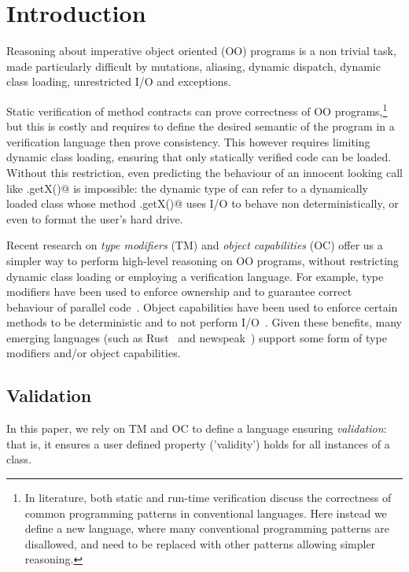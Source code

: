 
\section{Introduction}
\saveSpace\saveSpace

Reasoning about imperative object oriented (OO) programs is a non trivial task,
made particularly difficult by mutations, aliasing, dynamic dispatch, dynamic class loading,
unrestricted I/O and exceptions.

Static verification of method contracts can prove correctness of OO programs,\footnote{
In literature, both static and run-time verification discuss
the correctness of common programming patterns in conventional languages. Here instead we define a new language, where
many conventional programming patterns are disallowed,
and need to be replaced with other patterns allowing simpler reasoning.
} but this is costly and requires to define the desired semantic of the program in a verification language then prove consistency.
This however requires limiting dynamic class loading, ensuring that only statically verified code can be loaded.
Without this restriction, even predicting the behaviour of an innocent looking call like 
\Q@myPoint.getX()@ is impossible: the dynamic type of \Q@myPoint@ can refer to a dynamically loaded class
whose method \Q@.getX()@ uses I/O to behave non deterministically, or even to format the user’s hard drive.

Recent research on \emph{type modifiers} (TM) and \emph{object capabilities} (OC) offer us a simpler way to perform high-level reasoning on OO programs, without restricting dynamic class loading or employing a verification language.
For example, type modifiers have been used to enforce ownership and to guarantee correct behaviour of parallel code~\cite{GordonEtAl12,clebsch2015deny,clebsch2017orca}. Object capabilities have been used to enforce certain methods to be deterministic and to not perform I/O~\cite{finifter2008verifiable}.
Given these benefits, many emerging languages (such as Rust~\cite{matsakis2014rust} and newspeak~\cite{bracha2010modules})
support some form of type modifiers and/or object capabilities.

\loseSpace

\subsection{Validation}
In this paper, we rely on TM and OC to define a language ensuring \emph{validation}: that is, it ensures a user defined property ('validity') holds for all instances of a class.



